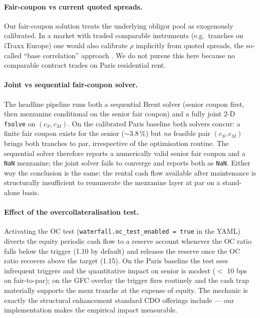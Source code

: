 \paragraph{Fair-coupon vs current quoted spreads.}
Our fair-coupon solution treats the underlying obligor pool as
exogenously calibrated. In a market with traded comparable instruments
(e.g.\ tranches on iTraxx Europe) one would also calibrate $\rho$
implicitly from quoted spreads, the so-called ``base correlation''
approach \autocite{AndersenSideniusBasu2003}. We do not pursue this here
because no comparable contract trades on Paris residential rent.

\paragraph{Joint vs sequential fair-coupon solver.}
The headline pipeline runs both a sequential Brent solver (senior coupon
first, then mezzanine conditional on the senior fair coupon) and a fully
joint 2-D \texttt{fsolve} on $(c_S, c_M)$. On the calibrated Paris
baseline both solvers concur: a finite fair coupon exists for the senior
($\sim 3.8$\,\%) but \emph{no} feasible pair $(c_S, c_M)$ brings both
tranches to par, irrespective of the optimisation routine. The
sequential solver therefore reports a numerically valid senior fair
coupon and a \texttt{NaN} mezzanine; the joint solver fails to converge
and reports both as \texttt{NaN}. Either way the conclusion is the same:
the rental cash flow available after maintenance is structurally
insufficient to remunerate the mezzanine layer at par on a stand-alone
basis.

\paragraph{Effect of the overcollateralisation test.}
Activating the OC test (\texttt{waterfall.oc\_test\_enabled = true} in
the YAML) diverts the equity periodic cash flow to a reserve account
whenever the OC ratio falls below the trigger (1.10 by default) and
releases the reserve once the OC ratio recovers above the target (1.15).
On the Paris baseline the test sees infrequent triggers and the
quantitative impact on senior is modest ($<$ 10 bps on fair-to-par);
on the GFC overlay the trigger fires routinely and the cash trap
materially supports the mezz tranche at the expense of equity. The
mechanic is exactly the structural enhancement standard CDO offerings
include — our implementation makes the empirical impact measurable.

